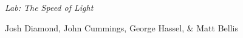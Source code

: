 {\LARGE {\em \noindent Lab: The Speed of Light}}

\large{\noindent Josh Diamond,  John Cummings, George Hassel, \& Matt Bellis}
